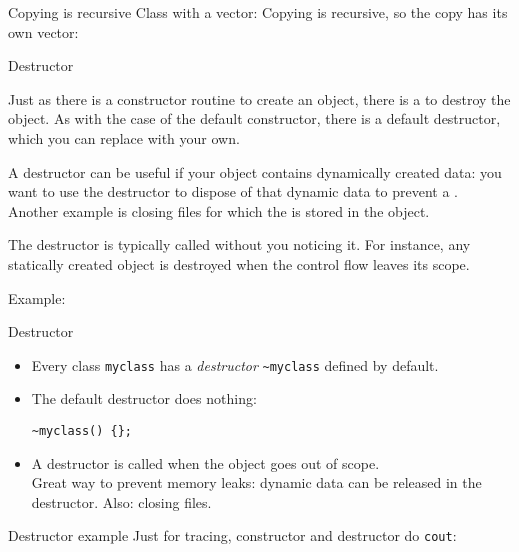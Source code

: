 \begin{block}{Copying is recursive}
  \label{sl:class-copy-vector}
  Class with a vector:
  \lstset{style=snippetcode}
  Copying is recursive, so the copy has its own vector:
\end{block}

 {Destructor}
\label{sec:destructor}

Just as there is a constructor routine to create an object, there is a
 to destroy the object.
As with the case of the default constructor, there is a default
destructor, which you can replace with your own.

A destructor can be useful if your object contains dynamically created
data: you want to use the destructor to dispose of that dynamic data
to prevent a . Another example is closing
files for which the  is stored in the object.

The destructor is typically called without you noticing it. For
instance, any statically created object is destroyed when the control
flow leaves its scope.

Example:
%

\begin{slide}{Destructor}
  \label{sl:class-destruct}
  \begin{itemize}
  \item Every class \lstinline{myclass} has a \emph{destructor} \lstinline{~myclass}
    defined by default.
  \item The default destructor does nothing:
\begin{lstlisting}
~myclass() {};
\end{lstlisting}
\item A destructor is called when the object goes out of scope.\\
  Great way to prevent memory leaks: dynamic data can be released
  in the destructor. Also: closing files.
\end{itemize}
\end{slide}

\begin{slide}{Destructor example}
  \label{sl:class-destruct-ex1}
  Just for tracing, constructor and destructor do \lstinline{cout}:
  \lstset{style=snippetcode}
\end{slide}

